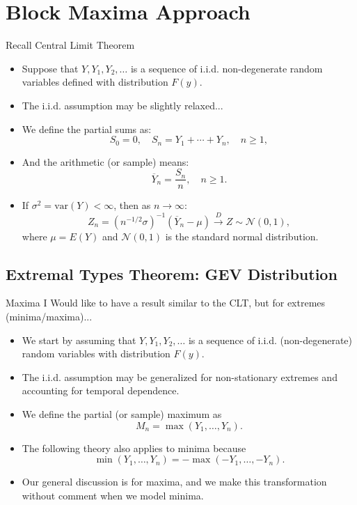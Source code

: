 \documentclass[10pt, hyperref={colorlinks = true,linkcolor = blue}]{beamer}
\begin{document}
{
\section{Block Maxima Approach}



\begin{frame}{Recall Central Limit Theorem}
\begin{itemize}
    \item Suppose that \( Y, Y_1, Y_2, \ldots \) is a sequence of i.i.d. non-degenerate random variables defined with distribution \( F(y) \).

    \item The i.i.d. assumption may be slightly relaxed...

    \item We define the partial sums as:
    \[
    S_0 = 0, \quad S_n = Y_1 + \cdots + Y_n, \quad n \geq 1,
    \]
    
    \item And the arithmetic (or sample) means:
    \[
    \overline{Y}_n = \frac{S_n}{n}, \quad n \geq 1.
    \]
    \item If \(\sigma^2 = \text{var}(Y) < \infty\), then as \(n \to \infty\):
    \[
    Z_n = \left( n^{-1/2} \sigma \right)^{-1} (\overline{Y}_n - \mu) \xrightarrow{D} Z \sim \mathcal{N}(0, 1),
    \]
    where \(\mu = E(Y)\) and \(\mathcal{N}(0, 1)\) is the standard normal distribution.


\end{itemize}

\end{frame}


{\subsection{Extremal Types Theorem: GEV Distribution}

\begin{frame}{Maxima I}
Would like to have a result similar to the CLT, but for extremes (minima/maxima)...
\begin{itemize}
    \item We start by assuming that $Y, Y_1, Y_2, \ldots$ is a sequence of i.i.d. (non-degenerate) random variables with distribution $F(y)$.
    \item The i.i.d. assumption may be generalized for non-stationary extremes and accounting for temporal dependence.
    \item We define the partial (or sample) maximum as
    \[
    M_n = \max(Y_1, \ldots, Y_n).
    \]
    \item The following theory also applies to minima because
    \[
    \min(Y_1, \ldots, Y_n) = -\max(-Y_1, \ldots, -Y_n).
    \]
    \item Our general discussion is for maxima, and we make this transformation without comment when we model minima.
\end{itemize}
\end{frame}


}}
\end{document}
